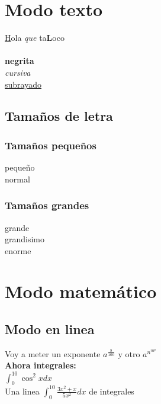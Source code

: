 \documentclass[10pt,a4paper]{report}
\begin{document}
\pagebreak
\tableofcontents
\pagebreak

\chapter{Modo texto}

{\underline Hola} {\it que} ta{\bf L}oco \\
\\
{\bf negrita} \\
{\it cursiva} \\
\underline{subrayado}

\section{Tamaños de letra}

\subsection{Tamaños pequeños}

{\tiny pequeño} \\
{\normalsize normal} \\

\subsection{Tamaños grandes}

{\large grande} \\
{\LARGE grandisimo} \\
{\huge enorme} \\

\chapter{Modo matemático}

\section{Modo en linea}

Voy a meter un exponente $ a^{\frac{8}{100}} $ y otro $ a^{n^{m^p}} $ \\


{\bf Ahora integrales:} \\

$ \int_{0}^{10} \cos^2 x dx $ \\

Una linea $ \int_{0}^{10} \frac{3x^2+x}{5x^2} dx $ de integrales
\end{document}
